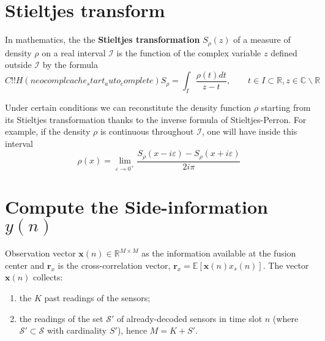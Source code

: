\section{Stieltjes transform}
In mathematics, the the \textbf{\textcolor[rgb]{1,0,0}{Stieltjes transformation}} $S_{\rho}(z)$ of a measure of density $\rho$ on a real interval $\mathcal{I}$ is the function of the complex variable $z$ defined outside $\mathcal{I}$ by the formula
\begin{equation}C!!H(neocomplcache_start_auto_complete)
    S_{\rho} = \int_I \dfrac{\rho(t) dt}{z-t}, \qquad t \in I \subset \mathbb{R}, z\in \mathbb{C} \backslash \mathbb{R}
    \label{eq-Stieltjes}
\end{equation}

Under certain conditions we can reconstitute the density function $\rho$ starting from its Stieltjes transformation thanks to the inverse formula of Stieltjes-Perron. For example, if the density $\rho$ is continuous throughout $\mathcal{I}$, one will have inside this interval
\begin{equation}
    \rho(x) = \lim_{\varepsilon \rightarrow 0^{+}} \dfrac{S_{\rho}(x-i\varepsilon) - S_{\rho}(x+i\varepsilon)}{2i\pi}
    \label{eq-Stieltjesinverse}
\end{equation}




\section{Compute the Side-information $y(n)$}
Observation vector $\mathbf{x}(n) \in \mathbb{R}^{M\times M}$ as the information available at the fusion center and $\mathbf{r}_x$ is the cross-correlation vector, $\mathbf{r}_x = \mathbb{E}[\mathbf{x}(n)x_s(n)]$. The vector $\mathbf{x}(n)$ collects: 
\begin{enumerate}
    \item the $K$ past readings of the sensors;
    \item the readings of the set $\mathcal{S}'$ of already-decoded sensors in time slot $n$ (where $\mathcal{S}' \subset \mathcal{S}$ with cardinality $S'$), hence $M = K+S'$. 
\end{enumerate}
